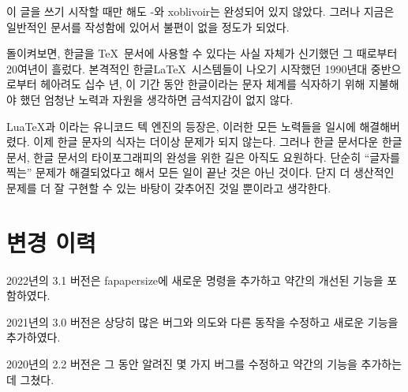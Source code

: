 \documentclass[
	12pt,
	a4paper,
	kosection,
	footnote,
	nobookmarks,
	microtype,
	figtabcapt,
]{oblivoir}
\newcommand\xobclass{x\-ob\-liv\-oir\oblivoirallowbreak}
\def\xetexko{\XeTeX-\ko}
\begin{document}
이 글을 쓰기 시작할 때만 해도 \xetexko{}와 \xobclass{}는
완성되어 있지 않았다. 그러나 지금은 일반적인 문서를 작성함에 있어서
불편이 없을 정도가 되었다.

\bigskip

돌이켜보면, 한글을 \TeX\ 문서에 사용할 수 있다는 사실 자체가
신기했던 그 때로부터 20여년이 흘렀다. 본격적인 한글\LaTeX\ 시스템들이
나오기 시작했던 1990년대 중반으로부터 헤아려도 십수 년,
이 기간 동안 한글이라는 문자 체계를 식자하기 위해 지불해야 했던
엄청난 노력과 자원을 생각하면 금석지감이 없지 않다.

Lua\TeX 과 \XeTeX 이라는 유니코드 텍 엔진의 등장은, 이러한 모든
노력들을 일시에 해결해버렸다. 이제 한글 문자의 식자는 더이상
문제가 되지 않는다.
그러나 한글 문서다운 한글 문서, 한글 문서의 타이포그래피의 완성을
위한 길은 아직도 요원하다. 단순히 “글자를 찍는” 문제가 해결되었다고
해서 모든 일이 끝난 것은 아닌 것이다. 단지 더 생산적인 문제를
더 잘 구현할 수 있는 바탕이 갖추어진 것일 뿐이라고 생각한다.


\section{변경 이력}

2022년의 3.1 버전은 fapapersize에 새로운 명령을 추가하고 약간의
개선된 기능을 포함하였다. 

2021년의 3.0 버전은 상당히 많은 버그와 의도와 다른 동작을 수정하고 새로운 
기능을 추가하였다.

2020년의 2.2 버전은 그 동안 알려진 몇 가지 버그를 수정하고 약간의 기능을
추가하는 데 그쳤다.




\end{document}
